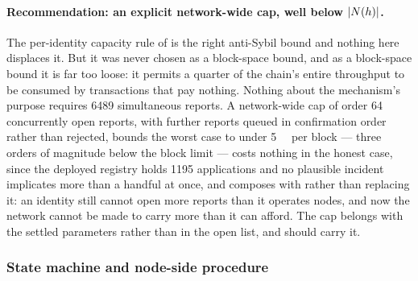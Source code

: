 \paragraph{Recommendation: an explicit network-wide cap, well below $\lvert N(h)\rvert$.} The
per-identity capacity rule of  is the right anti-Sybil bound and nothing here
displaces it. But it was never chosen as a block-space bound, and as a block-space bound it is far too
loose: it permits a quarter of the chain's entire throughput to be consumed by transactions that pay
nothing. Nothing about the mechanism's purpose requires \num{6489} simultaneous reports. A network-wide
cap of order \num{64} concurrently open reports, with further reports queued in confirmation order
rather than rejected, bounds the worst case to under \SI{5}{\kilo\byte} per block --- three orders of
magnitude below the block limit --- costs nothing in the honest case, since the deployed registry
holds \num{1195} applications and no plausible incident implicates more than a handful at once, and
composes with  rather than replacing it: an identity still cannot open more
reports than it operates nodes, and now the network cannot be made to carry more than it can afford.
The cap belongs with the settled parameters rather than in the open list, and 
should carry it.

\subsubsection{State machine and node-side procedure}

